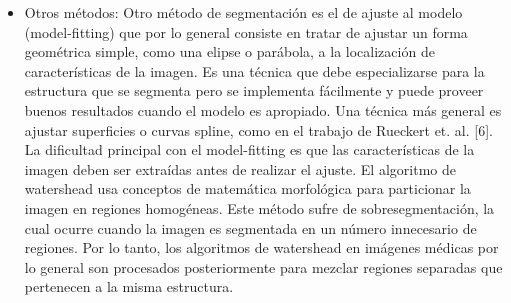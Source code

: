 \begin{itemize}
\item Otros m\'etodos: Otro m\'etodo de segmentaci\'on es el de ajuste al modelo (model-fitting) que por lo general consiste en tratar de ajustar un forma geom\'etrica simple, como una elipse o par\'abola, a la localizaci\'on de caracter\'isticas de la imagen. Es una t\'ecnica que debe especializarse para la estructura que se segmenta pero se implementa f\'acilmente y puede proveer buenos resultados cuando el modelo es apropiado. Una t\'ecnica m\'as general es ajustar superficies o curvas spline, como en el trabajo de Rueckert et. al. [6]. La dificultad principal con el model-fitting es que las caracter\'isticas de la imagen deben ser extra\'idas antes de realizar el ajuste. El algoritmo de watershead usa conceptos de matem\'atica morfol\'ogica para particionar la imagen en regiones homog\'eneas. Este m\'etodo sufre de sobresegmentaci\'on, la cual ocurre cuando la imagen es segmentada en un n\'umero innecesario de regiones. Por lo tanto, los algoritmos de watershead en im\'agenes médicas por lo general son procesados posteriormente para mezclar regiones separadas que pertenecen a la misma estructura. \cite{coto2003metodos}
\end{itemize}
